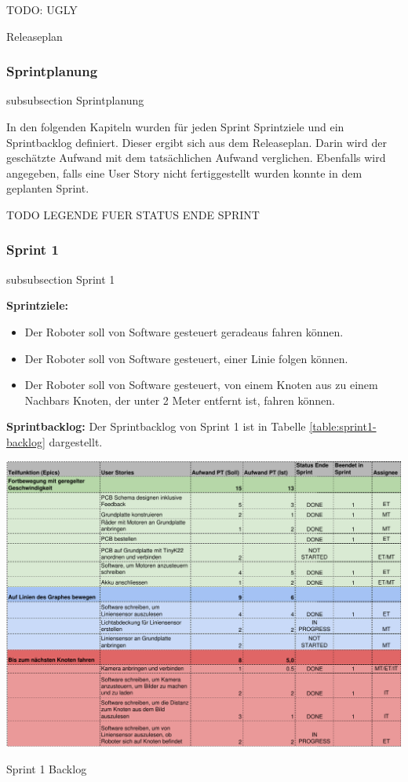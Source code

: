 TODO: UGLY



\begin{table}[H]
\centering
\caption{Releaseplan}
\label{table:release-plan}
\end{table}


\subsubsection*{Sprintplanung}
    {subsubsection}
    {Sprintplanung}

    
In den folgenden Kapiteln wurden für jeden Sprint Sprintziele und ein Sprintbacklog definiert. Dieser ergibt sich aus dem Releaseplan. Darin wird der geschätzte Aufwand mit dem tatsächlichen Aufwand verglichen. Ebenfalls wird angegeben, falls eine User Story nicht fertiggestellt wurden konnte in dem geplanten Sprint.

TODO LEGENDE FUER STATUS ENDE SPRINT

\subsubsection*{Sprint 1}
    {subsubsection}
    {Sprint 1}

\textbf{Sprintziele:}
\begin{itemize}
    \item Der Roboter soll von Software gesteuert geradeaus fahren können.
    \item Der Roboter soll von Software gesteuert, einer Linie folgen können.
    \item Der Roboter soll von Software gesteuert, von einem Knoten aus zu einem Nachbars Knoten, der unter 2 Meter entfernt ist, fahren können.
\end{itemize}

\textbf{Sprintbacklog:} Der Sprintbacklog von Sprint 1 ist in Tabelle 
\ref{table:sprint1-backlog} 
dargestellt.

\begin{table}[H]
\centering
\includegraphics[width=\textwidth]{assets/projektmanagement/sprint1-crop.pdf}
\caption{Sprint 1 Backlog}
\label{table:sprint1-backlog}
\end{table}

